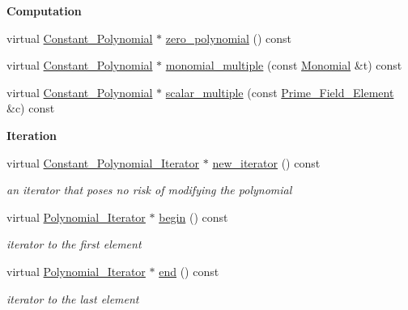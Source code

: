 \begin{Indent}\textbf{ Computation}\par
\begin{DoxyCompactItemize}
\item 
virtual \hyperlink{class_constant___polynomial}{Constant\+\_\+\+Polynomial} $\ast$ \hyperlink{class_constant___polynomial_a9fa38fcf15c142679d4baade49fe4515}{zero\+\_\+polynomial} () const
\item 
virtual \hyperlink{class_constant___polynomial}{Constant\+\_\+\+Polynomial} $\ast$ \hyperlink{class_constant___polynomial_a6fc38722a446ef063905914bbb3ada10}{monomial\+\_\+multiple} (const \hyperlink{class_monomial}{Monomial} \&t) const
\item 
virtual \hyperlink{class_constant___polynomial}{Constant\+\_\+\+Polynomial} $\ast$ \hyperlink{class_constant___polynomial_aa86d083f9ab6f2026e85d9581146c788}{scalar\+\_\+multiple} (const \hyperlink{class_prime___field___element}{Prime\+\_\+\+Field\+\_\+\+Element} \&c) const
\end{DoxyCompactItemize}
\end{Indent}
\begin{Indent}\textbf{ Iteration}\par
\begin{DoxyCompactItemize}
\item 
\mbox{\label{class_constant___polynomial_a4b536cccefefe033a5cc5378cbfe4848}} 
virtual \hyperlink{class_constant___polynomial___iterator}{Constant\+\_\+\+Polynomial\+\_\+\+Iterator} $\ast$ \hyperlink{class_constant___polynomial_a4b536cccefefe033a5cc5378cbfe4848}{new\+\_\+iterator} () const
\begin{DoxyCompactList}\small\item\em an iterator that poses no risk of modifying the polynomial \end{DoxyCompactList}\item 
\mbox{\label{class_constant___polynomial_a0ba3140aea76224edf2af10dbc1a5137}} 
virtual \hyperlink{class_polynomial___iterator}{Polynomial\+\_\+\+Iterator} $\ast$ \hyperlink{class_constant___polynomial_a0ba3140aea76224edf2af10dbc1a5137}{begin} () const
\begin{DoxyCompactList}\small\item\em iterator to the first element \end{DoxyCompactList}\item 
\mbox{\label{class_constant___polynomial_a0c5f367b62ce6d27f49614b23dfec809}} 
virtual \hyperlink{class_polynomial___iterator}{Polynomial\+\_\+\+Iterator} $\ast$ \hyperlink{class_constant___polynomial_a0c5f367b62ce6d27f49614b23dfec809}{end} () const
\begin{DoxyCompactList}\small\item\em iterator to the last element \end{DoxyCompactList}\end{DoxyCompactItemize}
\end{Indent}
